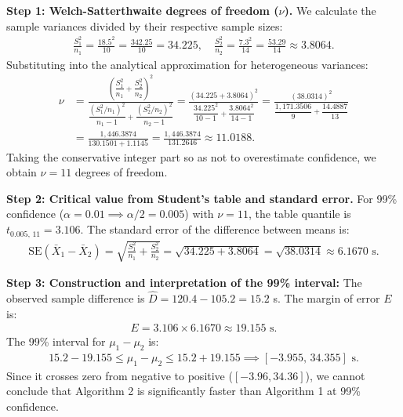 \begin{solucion}
	\textbf{Step 1: Welch-Satterthwaite degrees of freedom ($\nu$).}
	We calculate the sample variances divided by their respective sample sizes:
	\begin{align}
		\frac{S_1^2}{n_1} = \frac{18.5^2}{10} = \frac{342.25}{10} = 34.225, \quad \frac{S_2^2}{n_2} = \frac{7.3^2}{14} = \frac{53.29}{14} \approx 3.8064.
	\end{align}
	Substituting into the analytical approximation for heterogeneous variances:
	\begin{align}
		\nu &= \frac{\left( \dfrac{S_1^2}{n_1} + \dfrac{S_2^2}{n_2} \right)^2}{\dfrac{(S_1^2 / n_1)^2}{n_1 - 1} + \dfrac{(S_2^2 / n_2)^2}{n_2 - 1}} = \frac{(34.225 + 3.8064)^2}{\dfrac{34.225^2}{10 - 1} + \dfrac{3.8064^2}{14 - 1}} = \frac{(38.0314)^2}{\dfrac{1,171.3506}{9} + \dfrac{14.4887}{13}} \\
		&= \frac{1,446.3874}{130.1501 + 1.1145} = \frac{1,446.3874}{131.2646} \approx 11.0188.
	\end{align}
	Taking the conservative integer part so as not to overestimate confidence, we obtain $\nu = 11$ degrees of freedom.
	
	\textbf{Step 2: Critical value from Student's table and standard error.}
	For 99\% confidence ($\alpha = 0.01 \implies \alpha/2 = 0.005$) with $\nu = 11$, the table quantile is $t_{0.005, \, 11} = 3.106$.
	The standard error of the difference between means is:
	\begin{align}
		\text{SE}(\bar{X}_1 - \bar{X}_2) = \sqrt{\frac{S_1^2}{n_1} + \frac{S_2^2}{n_2}} = \sqrt{34.225 + 3.8064} = \sqrt{38.0314} \approx 6.1670 \text{ s.}
	\end{align}
	
	\textbf{Step 3: Construction and interpretation of the 99\% interval:}
	The observed sample difference is $\hat{D} = 120.4 - 105.2 = 15.2$ s. The margin of error $E$ is:
	\begin{align}
		E = 3.106 \times 6.1670 \approx 19.155 \text{ s.}
	\end{align}
	The 99\% interval for $\mu_1 - \mu_2$ is:
	\begin{align}
		15.2 - 19.155 \le \mu_1 - \mu_2 \le 15.2 + 19.155 \implies [-3.955, \, 34.355] \text{ s.}
	\end{align}
	Since it crosses zero from negative to positive ($[-3.96, 34.36]$), we cannot conclude that Algorithm 2 is significantly faster than Algorithm 1 at 99\% confidence.
\end{solucion}

